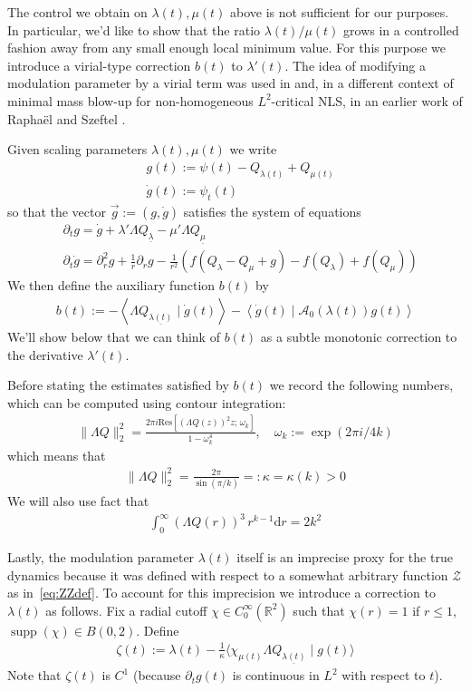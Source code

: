 \documentclass[10pt,reqno]{amsart}
\newcommand{\supp}{\operatorname{supp}}
\newcommand{\uln}[1]{{\underline{ #1 }}}
\newcommand{\A}{\mathcal{A}}
\newcommand{\ZZ}{\mathcal{Z}}
\newcommand{\R}{\mathbb{R}}
\newcommand{\om}{\omega}
\newcommand{\la}{\lambda}
\newcommand{\ka}{\kappa}
\newcommand{\La}{\Lambda}
\newcommand{\p}{\partial}
\newcommand{\I}{\infty}
\newcommand{\ang}[1]{\left\langle{#1}\right\rangle}
\newcommand{\EQ}[1]{\begin{equation}\begin{split} #1 \end{split}\end{equation}}
\numberwithin{equation}{section}
\theoremstyle{remark}
\newcommand{\mif}{{\ \ \text{if} \ \ }}
\newcommand{\ula}{\underline{\lambda}}
\newcommand{\umu}{\underline{\mu}}
\newcommand{\ud}{\mathrm{d}}
\newcommand{\0}{\emptyset}
\begin{document}
The control we obtain on $\la(t), \mu(t)$ above is not sufficient for our purposes. In particular, we'd like to show that the ratio $\la(t)/ \mu(t)$ grows in a controlled fashion away from any small enough local minimum value. For this purpose we introduce a virial-type correction  $b(t)$ to $\la'(t)$.
The idea of modifying a modulation parameter by a virial term was used in \cite{JJ-NLS}
and, in a different context of minimal mass blow-up for non-homogeneous $L^2$-critical NLS,
in an earlier work of Rapha\"el and Szeftel \cite{RaSz11}. 

Given scaling parameters $\la(t), \mu(t)$ we write 
\EQ{ \label{eq:gdef} 
&g(t) := \psi(t) - Q_{\la(t)} + Q_{\mu(t)} \\
&\dot g(t):= \psi_t(t)
}
so that the vector $\vec g:= (g, \dot g)$ satisfies the system of equations
\begin{align} \label{eq:ptg} 
&\p_t g = \dot{g} + \la' \La Q_{\ula} - \mu' \La Q_{\umu} \\
& \p_t \dot g = \p_r^2 g + \frac{1}{r} \p_r g  - \frac{1}{r^2} \left( f( Q_\la - Q_\mu + g) - f(Q_\la) + f(Q_\mu)\right) \label{eq:ptgdot} 
\end{align} 
We then define the auxiliary function $b(t)$ by  
\EQ{ \label{eq:bdef} 
b(t):= - \ang{ \La Q_{\underline{\la(t)}}  \mid \dot g(t)}  - \ang{ \dot g(t) \mid \A_0(\la(t)) g(t)}
}
We'll show below that we can think of $b(t)$ as a subtle monotonic correction to the derivative $\la'(t)$.

Before stating the estimates satisfied by $b(t)$ we  record the following numbers, which can be computed using contour integration: 
\EQ{
 \| \La Q \|_{2}^2  = \frac{2 \pi i \textrm{Res}[(\La Q(z))^2 z; \, \om_k]}{1- \om_k^4}, \quad \om_k:= \exp( 2\pi i/ 4k)
}
which means that 
\EQ{
 \| \La Q \|_{2}^2  = \frac{2\pi}{\sin(\pi/k)} =: \ka = \kappa(k)>0
}
We will also use  fact that 
\EQ{ \label{eq:LaQ3}
\int_0^\I (\La Q(r))^3 \, r^{k-1} \ud r = 2k^2
}

Lastly, the modulation parameter $\la(t)$ itself is an imprecise proxy for the true dynamics because it was defined with respect to a somewhat arbitrary function $\ZZ$ as in~\eqref{eq:ZZdef}. To account for this imprecision we introduce a correction to $\la(t)$ as follows. Fix a radial cutoff  $\chi\in C^{\infty}_0(\R^2)$ such that $\chi(r) = 1$ if $r \le 1$, $\supp( \chi) \in B(0, 2)$. Define 
\EQ{ \label{eq:zetadef} 
\zeta(t) := \lambda(t) - \frac{1}{\kappa}\langle \chi_{\mu(t)}\Lambda Q_{\uln{\lambda(t)}} \mid g(t)\rangle
}
Note that $\zeta(t)$ is $C^1$ (because $\partial_t g(t)$ is continuous in $L^2$ with respect to $t$). 
\end{document}
